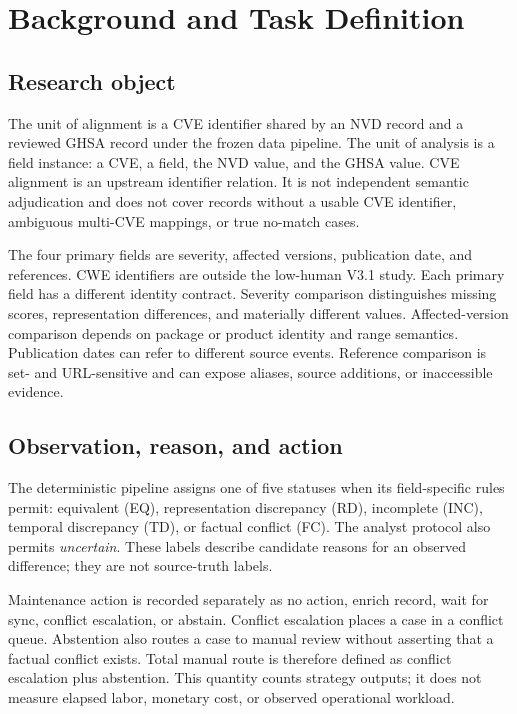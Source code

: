 \documentclass[preprint,review,12pt,authoryear]{elsarticle}
\begin{document}
\section{Background and Task Definition}
\label{sec:background}

\subsection{Research object}

The unit of alignment is a CVE identifier shared by an NVD record and a reviewed
GHSA record under the frozen data pipeline. The unit of analysis is a field
instance: a CVE, a field, the NVD value, and the GHSA value. CVE alignment is an
upstream identifier relation. It is not independent semantic adjudication and
does not cover records without a usable CVE identifier, ambiguous multi-CVE
mappings, or true no-match cases.

The four primary fields are severity, affected versions, publication date, and
references. CWE identifiers are outside the low-human V3.1 study. Each primary
field has a different identity contract. Severity comparison distinguishes
missing scores, representation differences, and materially different values.
Affected-version comparison depends on package or product identity and range
semantics. Publication dates can refer to different source events. Reference
comparison is set- and URL-sensitive and can expose aliases, source additions,
or inaccessible evidence.

\subsection{Observation, reason, and action}

The deterministic pipeline assigns one of five statuses when its field-specific
rules permit: equivalent (EQ), representation discrepancy (RD), incomplete
(INC), temporal discrepancy (TD), or factual conflict (FC). The analyst protocol
also permits \emph{uncertain}. These labels describe candidate reasons for an
observed difference; they are not source-truth labels.

Maintenance action is recorded separately as no action, enrich record, wait for
sync, conflict escalation, or abstain. Conflict escalation places a case in a
conflict queue. Abstention also routes a case to manual review without asserting
that a factual conflict exists. Total manual route is therefore defined as
conflict escalation plus abstention. This quantity counts strategy outputs; it
does not measure elapsed labor, monetary cost, or observed operational workload.
\end{document}
